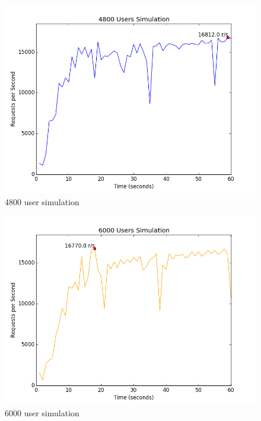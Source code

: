 \documentclass{article}
\begin{document}
\begin{figure}[H]
  \centering
  \includegraphics[scale=0.5]{diagrams/rps-4800.png}
  \caption{4800 user simulation}
\end{figure}

\begin{figure}[H]
  \centering
  \includegraphics[scale=0.5]{diagrams/rps-6000.png}
  \caption{6000 user simulation}
\end{figure}
\end{document}
